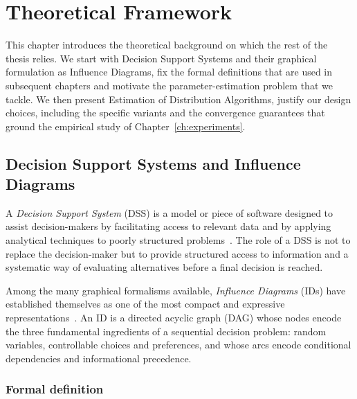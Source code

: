 
\chapter{Theoretical Framework}
\label{ch:framework}

This chapter introduces the theoretical background on which the rest of
the thesis relies. We start with Decision Support Systems and their graphical formulation as Influence Diagrams, fix the formal
definitions that are used in subsequent chapters and motivate the
parameter-estimation problem that we tackle. We then present
Estimation of Distribution Algorithms, justify our design choices, including the specific
variants and the convergence guarantees that ground the empirical study of Chapter~\ref{ch:experiments}.

\section{Decision Support Systems and Influence Diagrams}

A \emph{Decision Support System} (DSS) is a model or piece of
software designed to assist decision-makers by facilitating access to
relevant data and by applying analytical techniques to
poorly structured problems~\cite{insua2005,shenoy2009eolss}.
The role of a DSS is not to replace the decision-maker but to provide
structured access to information and a systematic way of evaluating
alternatives before a final decision is reached.

Among the many graphical formalisms available, \emph{Influence
Diagrams} (IDs) have established themselves as one of the most
compact and expressive
representations~\cite{howard2005influence,koller2009pgm}. An ID
is a directed acyclic graph (DAG) whose nodes encode the three fundamental
ingredients of a sequential decision problem: random variables,
controllable choices and preferences, and whose arcs encode
conditional dependencies and informational precedence.

\subsection{Formal definition}

